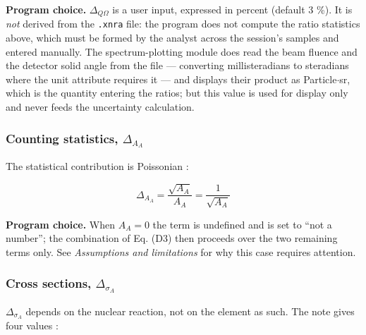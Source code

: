 \textbf{Program choice.} \(\Delta_{Q\Omega}\) is a user input, expressed
in percent (default 3 \%). It is \emph{not} derived from the
\texttt{.xnra} file: the program does not compute the ratio statistics
above, which must be formed by the analyst across the session's samples
and entered manually. The spectrum-plotting module does read the beam
fluence and the detector solid angle from the file --- converting
millisteradians to steradians where the unit attribute requires it ---
and displays their product as Particle\(\cdot\)sr, which is the quantity
entering the ratios; but this value is used for display only and never
feeds the uncertainty calculation.

\subsubsection{\texorpdfstring{Counting statistics,
\(\Delta_{A_A}\)}{Counting statistics, \textbackslash Delta\_\{A\_A\}}}\label{counting-statistics-delta_a_a}

The statistical contribution is Poissonian \citep[Eq. 4]{diallo2025iba}:

\[
\Delta_{A_A} = \frac{\sqrt{A_A}}{A_A} = \frac{1}{\sqrt{A_A}} \tag{D4}
\]

\textbf{Program choice.} When \(A_A = 0\) the term is undefined and is
set to ``not a number''; the combination of Eq. (D3) then proceeds over
the two remaining terms only. See \emph{Assumptions and limitations} for
why this case requires attention.

\subsubsection{\texorpdfstring{Cross sections,
\(\Delta_{\sigma_A}\)}{Cross sections, \textbackslash Delta\_\{\textbackslash sigma\_A\}}}\label{cross-sections-delta_sigma_a}

\(\Delta_{\sigma_A}\) depends on the nuclear reaction, not on the
element as such. The note gives four values \citep{diallo2025iba}:

